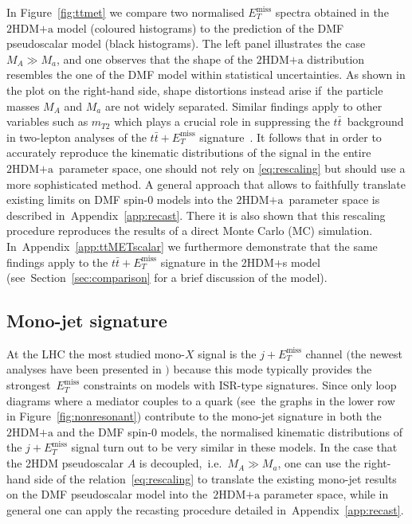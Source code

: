 \documentclass[a4paper, 11pt,notoc]{article}
\newcommand{\MET}{\ensuremath{E_T^\mathrm{miss}}\xspace}
\newcommand{\mA}{\ensuremath{M_{A}}\xspace}
\newcommand{\ma}{\ensuremath{M_{a}}\xspace}
\newcommand{\hdma}{\ensuremath{\textrm{2HDM+a}}\xspace}
\begin{document}
In Figure~\ref{fig:ttmet} we compare two normalised $\MET$ spectra obtained in the \hdma model (coloured histograms) to the prediction of the DMF pseudoscalar   model (black histograms).  The left panel illustrates the case~$M_A \gg M_a$, and one observes that the shape of the \hdma distribution resembles  the one of the DMF model within statistical uncertainties. As shown in the plot on the right-hand side, shape distortions instead arise if~the particle masses $M_A$ and $M_a$ are not widely separated.  Similar findings apply to other variables such as $m_{T2}$ which  plays a crucial role in suppressing the $t \bar t$~background in two-lepton analyses of the $t \bar t + \MET$ signature~\cite{Aaboud:2017rzf,Haisch:2016gry,CMS-PAS-EXO-17-014}. It follows that in order to accurately reproduce the kinematic distributions of the signal in the entire \hdma~parameter space, one should not rely on \eqref{eq:rescaling} but should use a more sophisticated method. A general approach  that allows to faithfully translate existing limits on DMF spin-0   models into the \hdma~parameter space  is described in~Appendix~\ref{app:recast}. There it is also shown that this rescaling procedure reproduces the results of a direct Monte Carlo (MC) simulation.  In~Appendix~\ref{app:ttMETscalar} we furthermore demonstrate that the same findings apply to the $t \bar t + \MET$ signature in the 2HDM+s model  (see~Section~\ref{sec:comparison} for a brief discussion of the model).

\subsection{Mono-jet signature}

At the LHC the most studied mono-$X$ signal is the $j +\MET$ channel $\big($the newest analyses have been presented in \cite{Aaboud:2017phn,Sirunyan:2017jix}$\big)$ because this mode typically provides the strongest~$\MET$ constraints on models with ISR-type  signatures. Since only loop diagrams where a mediator couples to a quark (see~the graphs in the lower row in Figure~\ref{fig:nonresonant}) contribute to the mono-jet signature in both the \hdma and the DMF spin-0 models, the normalised kinematic distributions of the $j +\MET$ signal turn out to be very similar in these models.  In the case that the 2HDM pseudoscalar $A$ is decoupled,~i.e.~$\mA \gg \ma$, one can use the right-hand side of the relation~\eqref{eq:rescaling} to translate the existing mono-jet results on the DMF pseudoscalar model into the~\hdma parameter space, while in general one can apply the recasting procedure detailed in~Appendix~\ref{app:recast}.
\end{document}
